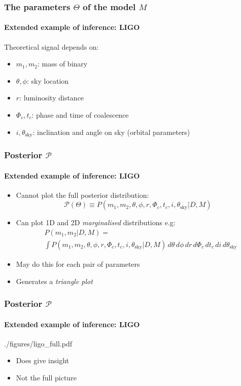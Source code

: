 \documentclass[%
]{beamer}
\begin{document}
\begin{frame}
    \frametitle{The parameters $\Theta$ of the model $M$}
    \framesubtitle{Extended example of inference: LIGO}
    Theoretical signal depends on:
    \begin{itemize}
        \item $m_1, m_2$: mass of binary
        \item $\theta, \phi$: sky location
        \item $r$: luminosity distance 
        \item $\Phi_c, t_c$: phase and time of coalescence
        \item $i, \theta_\text{sky}$: inclination and angle on sky (orbital parameters)
    \end{itemize}
\end{frame}



\begin{frame}
    \frametitle{Posterior $\mathcal{P}$}
    \framesubtitle{Extended example of inference: LIGO}
    \begin{itemize}
        \item Cannot plot the full posterior distribution:
            \[\mathcal{P}(\Theta) \equiv P(m_1,m_2,\theta,\phi,r,\Phi_c, t_c, i, \theta_\text{sky}|D,M)\]
        \item Can plot 1D and 2D {\em marginalised\/} distributions e.g:
            \begin{align}
            &P(m_1,m_2|D,M)=\nonumber\\&\int P(m_1,m_2,\theta,\phi,r,\Phi_c, t_c, i, \theta_\text{sky}|D,M) \,d\theta \,d\phi \,dr \,d\Phi_c \,d t_c \,d i \,d\theta_\text{sky}\nonumber
            \end{align}
        \item May do this for each pair of parameters
        \item Generates a {\em triangle plot}
    \end{itemize}
\end{frame}


\begin{frame}
    \frametitle{Posterior $\mathcal{P}$}
    \framesubtitle{Extended example of inference: LIGO}
    \begin{figleft}[0.65]{./figures/ligo_full.pdf}
		\begin{itemize}
          \item Does give insight
          \item Not the full picture
		\end{itemize}
    \end{figleft}
\end{frame}
\end{document}
